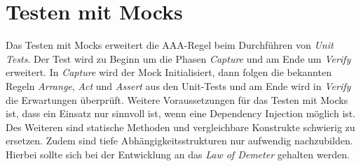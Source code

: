 \section{Testen mit Mocks}
Das Testen mit Mocks erweitert die AAA-Regel beim Durchführen von \textit{Unit Tests}.
Der Test wird zu Beginn um die Phasen \textit{Capture} und am Ende um \textit{Verify} erweitert.
In \textit{Capture} wird der Mock Initialisiert, dann folgen die bekannten Regeln \textit{Arrange}, \textit{Act} und \textit{Assert} aus den Unit-Tests und am Ende wird in \textit{Verify} die Erwartungen überprüft.
Weitere Voraussetzungen für das Testen mit Mocks ist, dass ein Einsatz nur sinnvoll ist, wenn eine Dependency Injection möglich ist.
Des Weiteren sind statische Methoden und vergleichbare Konstrukte schwierig zu ersetzen.
Zudem sind tiefe Abhängigkeitsstrukturen nur aufwendig nachzubilden.
Hierbei sollte sich bei der Entwicklung an das \textit{Law of Demeter} gehalten werden.

